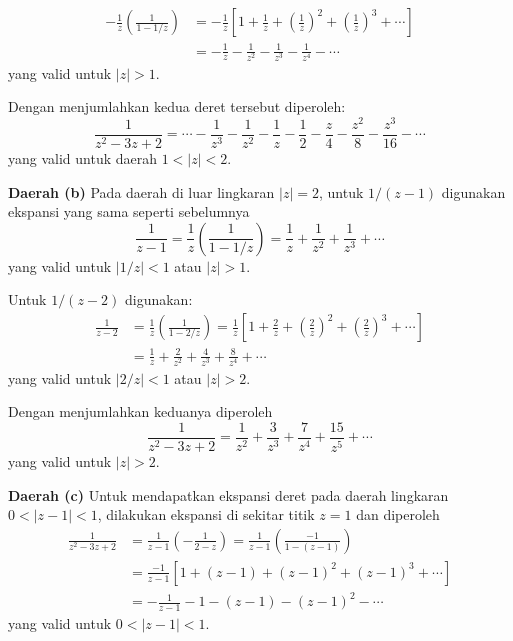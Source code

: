\begin{align*}
-\frac{1}{z}\left(\frac{1}{1-1/z}\right) & =-\frac{1}{z}\left[1+\frac{1}{z}+\left(\frac{1}{z}\right)^{2}+\left(\frac{1}{z}\right)^{3}+\cdots\right]\\
 & =-\frac{1}{z}-\frac{1}{z^{2}}-\frac{1}{z^{3}}-\frac{1}{z^{4}}-\cdots
\end{align*}
yang valid untuk $|z|>1$.

Dengan menjumlahkan kedua deret tersebut diperoleh:
\[
\frac{1}{z^{2}-3z+2}=\cdots-\frac{1}{z^{3}}-\frac{1}{z^{2}}-\frac{1}{z}-\frac{1}{2}-\frac{z}{4}-\frac{z^{2}}{8}-\frac{z^{3}}{16}-\cdots
\]
yang valid untuk daerah $1<|z|<2$.

\textbf{Daerah (b)} Pada daerah di luar lingkaran $|z|=2$, untuk $1/(z-1)$ digunakan
ekspansi yang sama seperti sebelumnya
\[
\frac{1}{z-1}=\frac{1}{z}\left(\frac{1}{1-1/z}\right)=\frac{1}{z}+\frac{1}{z^{2}}+\frac{1}{z^{3}}+\cdots
\]
yang valid untuk $|1/z|<1$ atau $|z|>1$.

Untuk $1/(z-2)$ digunakan:
\begin{align*}
\frac{1}{z-2} & =\frac{1}{z}\left(\frac{1}{1-2/z}\right)=\frac{1}{z}\left[1+\frac{2}{z}+\left(\frac{2}{z}\right)^{2}+\left(\frac{2}{z}\right)^{3}+\cdots\right]\\
 & =\frac{1}{z}+\frac{2}{z^{2}}+\frac{4}{z^{3}}+\frac{8}{z^{4}}+\cdots
\end{align*}
yang valid untuk $|2/z|<1$ atau $|z|>2$.

Dengan menjumlahkan keduanya diperoleh
\[
\frac{1}{z^{2}-3z+2}=\frac{1}{z^{2}}+\frac{3}{z^{3}}+\frac{7}{z^{4}}+\frac{15}{z^{5}}+\cdots
\]
yang valid untuk $|z|>2$.

\textbf{Daerah (c)} Untuk mendapatkan ekspansi deret pada daerah lingkaran $0<|z-1|<1$,
dilakukan ekspansi di sekitar titik $z=1$ dan diperoleh
\begin{align*}
\frac{1}{z^{2}-3z+2} & =\frac{1}{z-1}\left(-\frac{1}{2-z}\right)=\frac{1}{z-1}\left(\frac{-1}{1-(z-1)}\right)\\
 & =\frac{-1}{z-1}\left[1+(z-1)+(z-1)^{2}+(z-1)^{3}+\cdots\right]\\
 & =-\frac{1}{z-1}-1-(z-1)-(z-1)^{2}-\cdots
\end{align*}
yang valid untuk $0<|z-1|<1$.






